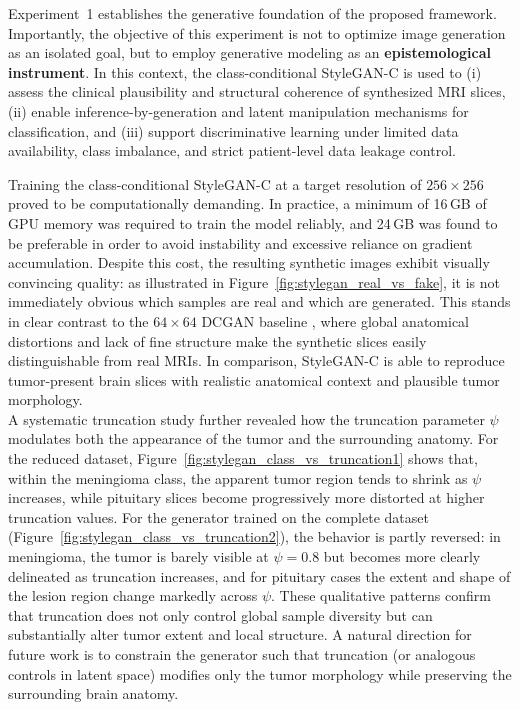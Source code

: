 Experiment~1 establishes the generative foundation of the proposed framework. Importantly, the objective of this experiment is not to optimize image generation as an isolated goal, but to employ generative modeling as an \textbf{epistemological instrument}. In this context, the class-conditional StyleGAN-C is used to (i) assess the clinical plausibility and structural coherence of synthesized MRI slices, (ii) enable inference-by-generation and latent manipulation mechanisms for classification, and (iii) support discriminative learning under limited data availability, class imbalance, and strict patient-level data leakage control.

Training the class-conditional StyleGAN-C at a target resolution of $256\times256$ proved to be computationally demanding. In practice, a minimum of 16\,GB of GPU memory was required to train the model reliably, and 24\,GB was found to be preferable in order to avoid instability and excessive reliance on gradient accumulation. Despite this cost, the resulting synthetic images exhibit visually convincing quality: as illustrated in Figure~\ref{fig:stylegan_real_vs_fake}, it is not immediately obvious which samples are real and which are generated. This stands in clear contrast to the $64\times64$ DCGAN baseline \cite{GHASSEMI2020101678}, where global anatomical distortions and lack of fine structure make the synthetic slices easily distinguishable from real MRIs. In comparison, StyleGAN-C is able to reproduce tumor-present brain slices with realistic anatomical context and plausible tumor morphology.\\

A systematic truncation study further revealed how the truncation parameter $\psi$ modulates both the appearance of the tumor and the surrounding anatomy. For the reduced dataset, Figure~\ref{fig:stylegan_class_vs_truncation1} shows that, within the meningioma class, the apparent tumor region tends to shrink as $\psi$ increases, while pituitary slices become progressively more distorted at higher truncation values. For the generator trained on the complete dataset (Figure~\ref{fig:stylegan_class_vs_truncation2}), the behavior is partly reversed: in meningioma, the tumor is barely visible at $\psi=0.8$ but becomes more clearly delineated as truncation increases, and for pituitary cases the extent and shape of the lesion region change markedly across $\psi$. These qualitative patterns confirm that truncation does not only control global sample diversity but can substantially alter tumor extent and local structure. A natural direction for future work is to constrain the generator such that truncation (or analogous controls in latent space) modifies only the tumor morphology while preserving the surrounding brain anatomy.\\

